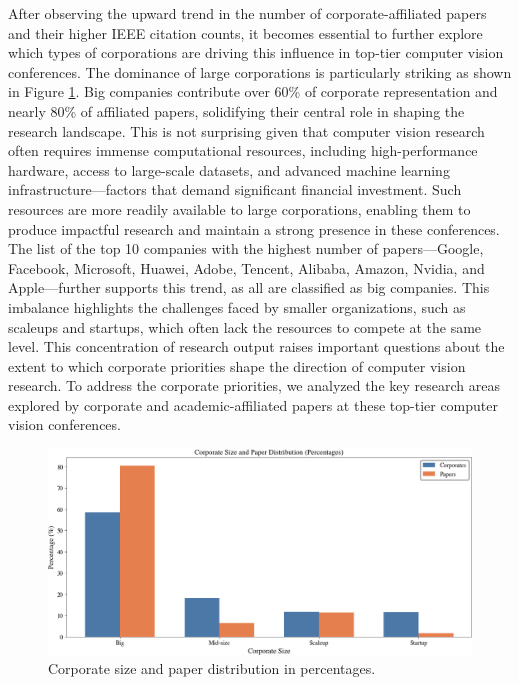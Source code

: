 \documentclass{article}
\begin{document}
After observing the upward trend in the number of corporate-affiliated papers and their higher IEEE citation counts, it becomes essential to further explore which types of corporations are driving this influence in top-tier computer vision conferences. The dominance of large corporations is particularly striking as shown in Figure \ref{fig:corporate_size_graph}. Big companies contribute over 60\% of corporate representation and nearly 80\% of affiliated papers, solidifying their central role in shaping the research landscape. This is not surprising given that computer vision research often requires immense computational resources, including high-performance hardware, access to large-scale datasets, and advanced machine learning infrastructure—factors that demand significant financial investment. Such resources are more readily available to large corporations, enabling them to produce impactful research and maintain a strong presence in these conferences. The list of the top 10 companies with the highest number of papers—Google, Facebook, Microsoft, Huawei, Adobe, Tencent, Alibaba, Amazon, Nvidia, and Apple—further supports this trend, as all are classified as big companies. This imbalance highlights the challenges faced by smaller organizations, such as scaleups and startups, which often lack the resources to compete at the same level. This concentration of research output raises important questions about the extent to which corporate priorities shape the direction of computer vision research. To address the corporate priorities, we analyzed the key research areas explored by corporate and academic-affiliated papers at these top-tier computer vision conferences. 

\begin{figure}[ht]
  \centering
  \includegraphics[width=\textwidth]{report/images/corporate_paper_distribution.png}  
  \caption{Corporate size and paper distribution in percentages.}
  \label{fig:corporate_size_graph}
\end{figure}
\end{document}
